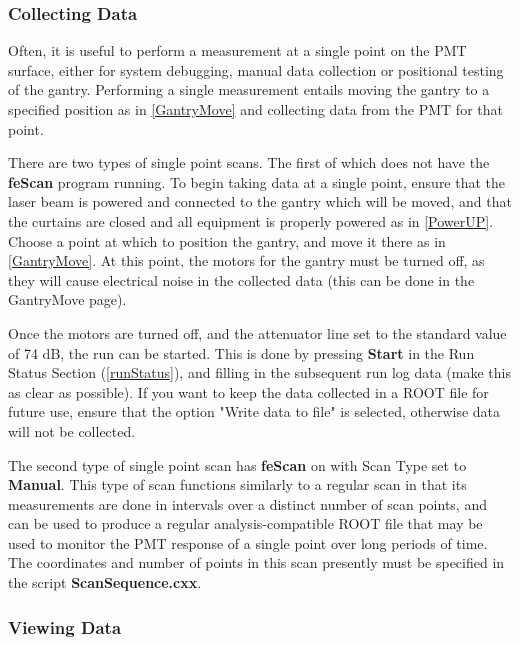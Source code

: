 \documentclass[twoside,letterpaper]{refart}
\begin{document}
\subsubsection{Collecting Data}

Often, it is useful to perform a measurement at a single point on the PMT surface, either for system debugging, manual data collection or positional testing of the gantry.  Performing a single measurement entails moving the gantry to a specified position as in \ref{GantryMove} and collecting data from the PMT for that point.

There are two types of single point scans. The first of which does not have the \textbf{feScan} program running. To begin taking data at a single point, ensure that the laser beam is powered and connected to the gantry which will be moved, and that the curtains are closed and all equipment is properly powered as in \ref{PowerUP}.  Choose a point at which to position the gantry, and move it there as in \ref{GantryMove}.  At this point, the motors for the gantry must be turned off, as they will cause electrical noise in the collected data (this can be done in the GantryMove page). 

Once the motors are turned off, and the attenuator line set to the standard value of 74 dB, the run can be started. This is done by pressing \textbf{Start} in the Run Status Section (\ref{runStatus}), and filling in the subsequent run log data (make this as clear as possible).  If you want to keep the data collected in a ROOT file for future use, ensure that the option "Write data to file" is selected, otherwise data will not be collected. 

The second type of single point scan has \textbf{feScan} on with Scan Type set to \textbf{Manual}. This type of scan functions similarly to a regular scan in that its measurements are done in intervals over a distinct number of scan points, and can be used to produce a regular analysis-compatible ROOT file that may be used to monitor the PMT response of a single point over long periods of time. The coordinates and number of points in this scan presently must be specified in the script \textbf{ScanSequence.cxx}. 

\subsubsection{Viewing Data}
\end{document}
